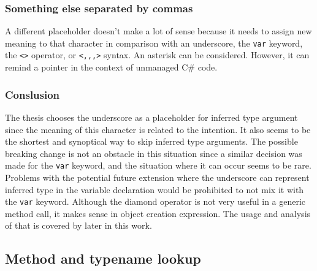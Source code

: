 \subsubsection{Something else separated by commas} 

A different placeholder doesn't make a lot of sense because it needs to assign new meaning to that character in comparison with an underscore, the \texttt{var} keyword, the \texttt{<>} operator, or \texttt{<,,,>} syntax. 
An asterisk can be considered.
However, it can remind a pointer in the context of unmanaged C\# code.

\subsubsection{Conslusion} 

The thesis chooses the underscore as a placeholder for inferred
type argument since the meaning of this character is related to the intention. 
It also seems to be the shortest and synoptical way to skip inferred type arguments. 
The possible breaking change is not an obstacle in this situation since a similar decision was made for the \texttt{var} keyword, and the situation where it can occur seems to be rare. 
Problems with the potential future extension where the underscore can represent inferred type in the variable declaration would be prohibited to not mix it with the \texttt{var} keyword. 
Although the diamond operator is not very useful in a generic method call, it makes sense in object creation expression. 
The usage and analysis of that is covered by later in this work.

\subsection{Method and typename lookup}

